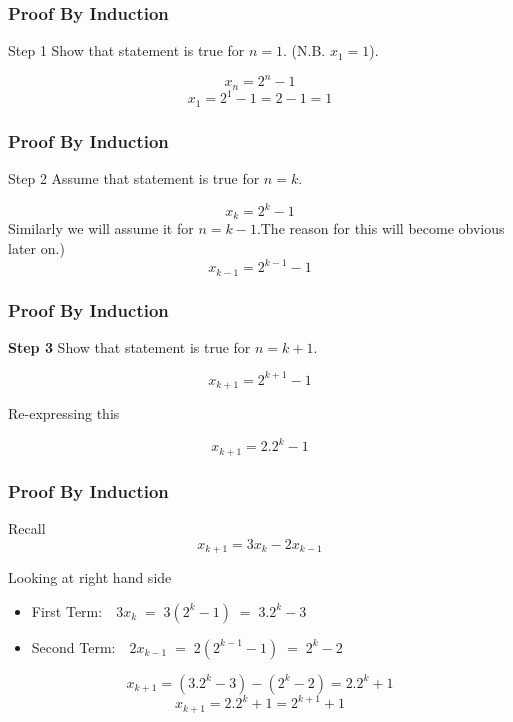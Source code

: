 \documentclass{beamer}
\begin{document}
\begin{frame}
\frametitle{Proof By Induction}
Step 1 Show that statement is true for $n=1$.
(N.B. $x_{1} = 1$).

\[ x_n = 2^n - 1 \]
\[ x_1 = 2^1 - 1 = 2 - 1 = 1\]
\end{frame}
\begin{frame}
\frametitle{Proof By Induction}
Step 2 Assume that statement is true for $n=k$.

\[ x_k = 2^k - 1 \]
Similarly we will assume it for $n=k-1$.The reason for this will become obvious later on.)
\[ x_{k-1} = 2^{k-1} - 1 \]
\end{frame}
\begin{frame}
\frametitle{Proof By Induction}
\textbf{Step 3} Show that statement is true for $n=k+1$.

\[ x_{k+1} = 2^{k+1} - 1 \]

Re-expressing this

\[ x_{k+1} = 2.2^{k} - 1 \]
\end{frame}
\begin{frame}
\frametitle{Proof By Induction}
\large
Recall
\Large 
\[ x_{k+1} = 3x_{k} - 2x_{k-1} \]

\vspace{0.5cm}
\large
Looking at right hand side 
\begin{itemize}
\item First Term: $\mbox{       }  3x_{k}\; = \;3(2^{k} - 1) \;=\; 3.2^{k} - 3$
\item Second Term: $ \mbox{       }2x_{k-1} \;= \;2(2^{k-1} - 1) \;= \;2^{k} - 2$
\end{itemize}
\vspace{0.5cm}
\Large
\[ x_{k+1} = (3.2^{k} - 3) - (2^{k} - 2) = 2.2^{k} + 1 \]
\[ x_{k+1} = 2.2^{k} + 1 = 2^{k+1} + 1 \]
\end{frame}
 
\end{document}
